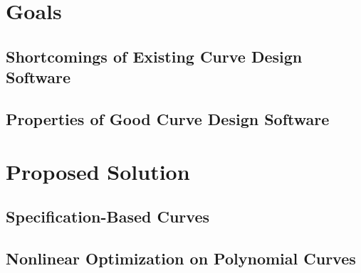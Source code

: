 \documentclass[a4paper]{article}
\begin{document}
	\section{Goals}

		\subsection{Shortcomings of Existing Curve Design Software}


		\subsection{Properties of Good Curve Design Software}


	\section{Proposed Solution}

		\subsection{Specification-Based Curves}


		\subsection{Nonlinear Optimization on Polynomial Curves}

\end{document}
